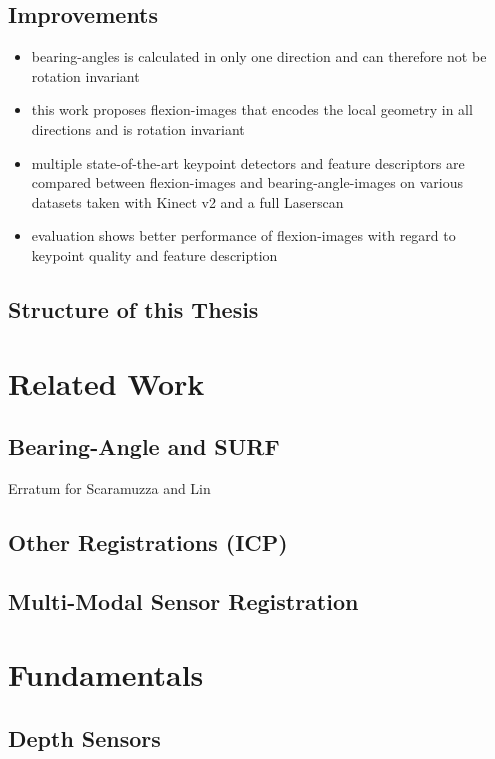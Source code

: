 \subsection{Improvements}

\begin{itemize}
    \item \Glspl{bearing-angle} is calculated in only one direction and can therefore not be rotation invariant
    \item this work proposes \Glspl{flexion-image} that encodes the local geometry in all directions and is rotation invariant
    \item multiple state-of-the-art keypoint detectors and feature descriptors are compared between \Glspl{flexion-image} and \Glspl{bearing-angle-image} on various datasets taken with Kinect v2 and a full Laserscan
    \item evaluation shows better performance of \Glspl{flexion-image} with regard to keypoint quality and feature description
\end{itemize}

\subsection{Structure of this Thesis}

\section{Related Work}

\subsection{Bearing-Angle and SURF}
Erratum for Scaramuzza and Lin
\subsection{Other Registrations (ICP)}
\subsection{Multi-Modal Sensor Registration}

\section{Fundamentals}

\subsection{Depth Sensors}
